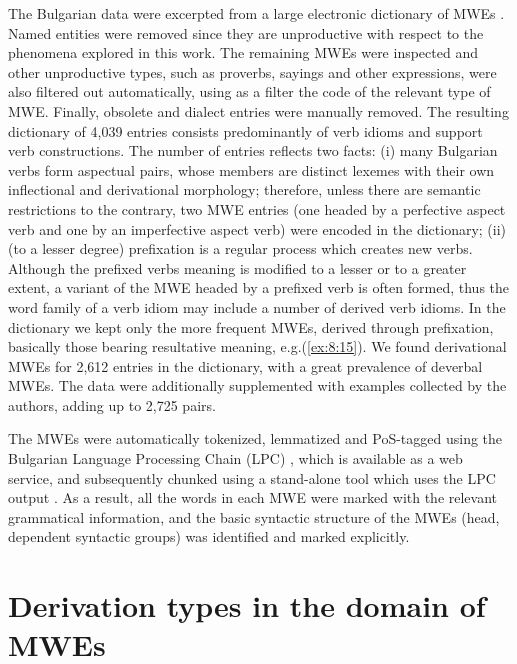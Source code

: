 \documentclass[output=paper]{langsci/langscibook}
\begin{document}
The Bulgarian data were excerpted from a large electronic dictionary of
MWEs \citep{Stoyanova2014}. Named entities were removed since
they are unproductive with respect to the phenomena explored in this work.
The remaining MWEs were inspected and other unproductive types, such as
proverbs, sayings and other expressions, were also filtered out
automatically, using as a filter the code of the relevant type of MWE.
Finally, obsolete and dialect entries were manually removed. The
resulting dictionary of 4,039 entries consists predominantly of verb
idioms  and support verb constructions. The number of entries reflects
two facts: (i) many Bulgarian verbs form aspectual pairs, whose members
are distinct lexemes with their own inflectional and derivational
morphology; therefore, unless there are semantic restrictions to the
contrary, two MWE entries (one headed by a perfective aspect verb and
one by an imperfective aspect verb) were encoded in the dictionary;
(ii) (to a lesser degree) prefixation is a regular process which creates new
verbs. Although the prefixed verbs meaning is modified to
a lesser or to a greater extent, a variant of the MWE headed by a
prefixed verb is often formed, thus the word family of a verb idiom may
include a number of derived verb idioms. In the dictionary we kept only
the more frequent MWEs, derived through prefixation, basically those
bearing resultative meaning, e.g.\@ (\ref{ex:8:15}). We found derivational MWEs for
2,612 entries in the dictionary, with a great prevalence of deverbal 
MWEs. The data were additionally supplemented with examples collected
by the authors, adding up to 2,725 pairs.



The MWEs were automatically tokenized, lemmatized and PoS-tagged using
the Bulgarian Language Processing Chain (LPC) \citep{koeva2011},
which is available as a web service, and subsequently chunked using a
stand-alone tool which uses the LPC output \citep{Stoyanova2015}. As a result, all the words in each MWE were marked with
the relevant grammatical information, and the basic syntactic structure
of the MWEs (head, dependent syntactic groups) was identified and
marked explicitly.




\section{Derivation types in the domain of MWEs }
\end{document}
